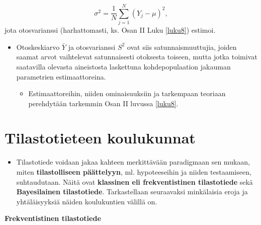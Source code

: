 \documentclass[
]{book}
\providecommand{\tightlist}{%
  \setlength{\itemsep}{0pt}\setlength{\parskip}{0pt}}
\begin{document}
\[
\sigma^2= \frac{1}{N} \sum_{j=1}^{N} (Y_j - \mu)^2,
\]
jota otosvarianssi (harhattomasti, ks. Osan II Luku \ref{luku8}) estimoi.

\begin{itemize}
\tightlist
\item
  Otoskeskiarvo \(\bar{Y}\) ja otosvarianssi \(S^2\) ovat siis satunnaismuuttujia, joiden saamat arvot vaihtelevat satunnaisesti otoksesta toiseen, mutta jotka toimivat saatavilla olevasta aineistosta laskettuna kohdepopulaation jakauman parametrien estimaattoreina.

  \begin{itemize}
  \tightlist
  \item
    Estimaattoreihin, niiden ominaisuuksiin ja tarkempaan teoriaan perehdytään tarkemmin Osan II luvussa \ref{luku8}.
  \end{itemize}
\end{itemize}

\hypertarget{tilastotieteen-koulukunnat}{%
\section{Tilastotieteen koulukunnat}\label{tilastotieteen-koulukunnat}}

\begin{itemize}
\tightlist
\item
  Tilastotiede voidaan jakaa kahteen merkittävään paradigmaan sen mukaan, miten \textbf{tilastolliseen päättelyyn}, ml. hypoteeseihin ja niiden testaamiseen, suhtaudutaan. Näitä ovat \textbf{klassinen eli frekventistinen tilastotiede} sekä \textbf{Bayesilainen tilastotiede}. Tarkastellaan seuraavaksi minkälaisia eroja ja yhtäläisyyksiä näiden koulukuntien välillä on.
\end{itemize}

\textbf{Frekventistinen tilastotiede}
\end{document}
